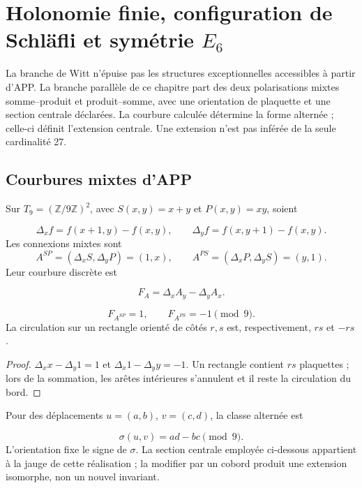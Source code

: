 \section{Holonomie finie, configuration de Schläfli et symétrie \texorpdfstring{\(E_6\)}{E6}}
\label{p12-83-c20-s6:chap:holonomia-schlafli-e6-nuevo}

La branche de Witt n'épuise pas les structures exceptionnelles accessibles à partir d'APP. La branche parallèle de ce chapitre part des deux polarisations mixtes somme--produit et produit--somme, avec une orientation de plaquette et une section centrale déclarées. La courbure calculée détermine la forme alternée ; celle-ci définit l'extension centrale. Une extension n'est pas inférée de la seule cardinalité 27.

\subsection{Courbures mixtes d’APP
}

Sur \(T_9=(\mathbb Z/9\mathbb Z)^2\), avec
\(S(x,y)=x+y\) et \(P(x,y)=xy\), soient

\[
 \Delta_xf=f(x+1,y)-f(x,y),\qquad
 \Delta_yf=f(x,y+1)-f(x,y).
\]
Les connexions mixtes sont
\[
 A^{SP}=(\Delta_xS,\Delta_yP)=(1,x),\qquad
 A^{PS}=(\Delta_xP,\Delta_yS)=(y,1).
\]
Leur courbure discrète est

\[
 F_A=\Delta_xA_y-\Delta_yA_x.
\]

\begin{proposition}
\label{p12-83-c20-s6:prop:curvaturas-app-e6-nuevo}
\[
 F_{A^{SP}}=1,\qquad F_{A^{PS}}=-1\pmod9.
\]
La circulation sur un rectangle orienté de côtés \(r,s\) est,
respectivement, \(rs\) et \(-rs\).

\end{proposition}

\begin{proof}
\(\Delta_xx-\Delta_y1=1\) et
\(\Delta_x1-\Delta_yy=-1\). Un rectangle contient \(rs\) plaquettes ; lors de la
sommation, les arêtes intérieures s’annulent et il reste la circulation du bord.
\end{proof}

Pour des déplacements \(u=(a,b)\), \(v=(c,d)\), la classe alternée est

\begin{equation}
 \sigma(u,v)=ad-bc\pmod9.
 \label{p12-83-c20-s6:eq:forma-alternante-e6-nueva}
\end{equation}
L’orientation fixe le signe de \(\sigma\). La section centrale employée
ci-dessous appartient à la jauge de cette réalisation ; la modifier par un cobord
produit une extension isomorphe, non un nouvel invariant.


